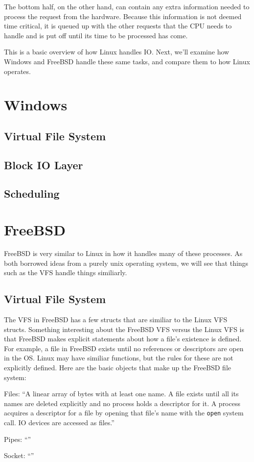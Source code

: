 \documentclass[10pt,letterpaper,onecolumn,draftclsnofoot]{IEEEtran}
\begin{document}
  The bottom half, on the other hand, can contain any extra information needed
  to process the request from the hardware. Because this information is not deemed
  time critical, it is queued up with the other requests that the CPU needs to handle
  and is put off until its time to be processed has come. \cite{robertlove2010}



  This is a basic overview of how Linux handles IO. Next, we'll examine how Windows
  and FreeBSD handle these same tasks, and compare them to how Linux operates.

\section{Windows}
 \subsection{Virtual File System}
 \subsection{Block IO Layer}
 \subsection{Scheduling}
\section{FreeBSD}
  FreeBSD is very similar to Linux in how it handles many of these processes. As
  both borrowed ideas from a purely unix operating system, we will see that things
  such as the VFS handle things similiarly.

 \subsection{Virtual File System}
 The VFS in FreeBSD has a few structs that are similiar to the Linux VFS structs.
 Something interesting about the FreeBSD VFS versus the Linux VFS is that FreeBSD
 makes explicit statements about how a file's existence is defined. For example,
 a file in FreeBSD exists until no references or descriptors are open in the OS.
 Linux may have similiar functions, but the rules for these are not explicitly
 defined. Here are the basic objects that make up the FreeBSD file system:
 \cite{freebsd2016}
 \begin{description}
   \item Files: ``A linear array of bytes with at least one name. A file exists
   until all its names are deleted explicitly and no process holds a descriptor
   for it. A process acquires a descriptor for a file by opening that file's name
   with the \texttt{open} system call. IO devices are accessed as files.''
   \item Pipes: ``''
   \item Socket: ``''
 \end{description}
\end{document}
